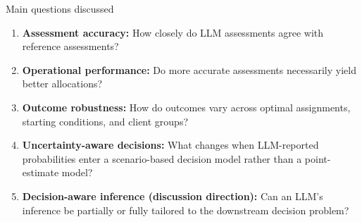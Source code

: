 \documentclass[aspectratio=169,11pt]{beamer}
\newcommand{\key}[1]{\textcolor{deepblue}{\textbf{#1}}}
\begin{document}
\begin{frame}{Main questions discussed}

\small

\begin{enumerate}
\setlength{\itemsep}{9pt}

\item \key{Assessment accuracy:} How closely do LLM assessments agree with reference assessments?

\item \key{Operational performance:} Do more accurate assessments necessarily yield better allocations?

\item \key{Outcome robustness:} How do outcomes vary across optimal assignments, starting conditions, and client groups?

\item \key{Uncertainty-aware decisions:} What changes when LLM-reported probabilities enter a scenario-based decision model rather than a point-estimate model?

\item \key{Decision-aware inference (discussion direction):} Can an LLM's inference be partially or fully tailored to the downstream decision problem?

\end{enumerate}

\end{frame}
\end{document}
